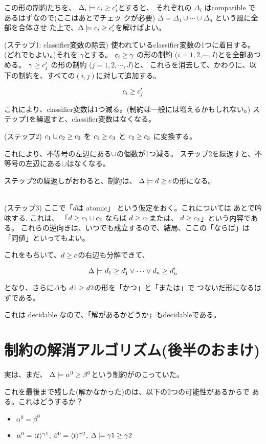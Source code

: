 この形の制約たちを、
$\Delta_i \models {c_i} \ge {c'_i}$とすると、
それぞれの $\Delta_i$ はcompatible であるはずなので(ここはあとでチェッ
クが必要)
$\Delta = \Delta_1 \cup \cdots \cup \Delta_n$ という風に全部を合体させ
た上で、$\Delta \models {c_i} \ge {c'_i}$を解けばよい。

(ステップ1: classifier変数の除去)
使われているclassifier変数の1つに着目する。(どれでもよい。)それを
$\gamma$とする。
${c_i} \ge {\gamma}$ の形の制約 ($i=1,2,\cdots,I$)とを全部あつめる。
${\gamma} \ge {c'_j}$ の形の制約 ($j=1,2,\cdots,J$)と、
これらを消去して、かわりに、以下の制約を、すべての$(i,j)$に対して追加する。

\[
  {c_i} \ge {c'_j}
\]

これにより、classifier変数は1つ減る。(制約は一般には増えるかもしれない。)
ステップ1を繰返すと、classifier変数はなくなる。

(ステップ2) ${c_1 \cup c_2} \ge {c_3}$ を
${c_1} \ge {c_3}$ と
${c_2} \ge {c_3}$ に変換する。

これにより、不等号の左辺にある$\cup$の個数が1つ減る。
ステップ2を繰返すと、不等号の左辺にある$\cup$はなくなる。

ステップ2の繰返しがおわると、制約は、
$\Delta \models {d} \ge {c}$の形になる。

\\
(ステップ3) ここで「$d$は atomic」 という仮定をおく。これについては
あとで吟味する.
これは、
「${d} \ge {c_1 \cup c_2}$ ならば
${d} \ge {c_1}$または、
${d} \ge {c_2}$」という内容である。
これらの逆向きは、いつでも成立するので、結局、ここの「ならば」は「同値」といってもよい。

これをもちいて、${d} \ge {c}$の右辺も分解できて、

\[
  \Delta \models {d_1} \ge {d_1'} \vee \cdots \vee {d_n} \ge {d'_n}
\]

となり、さらに$\Delta$も ${d1} \ge {d2}$の形を「かつ」と「または」で
つないだ形になるはずである。

これは decidable なので、「解があるかどうか」もdecidableである。

\section{制約の解消アルゴリズム(後半のおまけ)}

実は、まだ、
$\Delta \models {\alpha^0} \ge {\beta^0}$という制約がのこっていた。

これを最後まで残した(解かなかった)のは、以下の2つの可能性があるからで
ある。これはどうするか？

\begin{itemize}
\item $\alpha^0 = \beta^0$
\item
  $\alpha^0 = \langle{t}\rangle^{\gamma1}$,
  $\beta^0 = \langle{t}\rangle^{\gamma2}$,
  $\Delta \models {\gamma1} \ge {\gamma2}$
\end{itemize}


